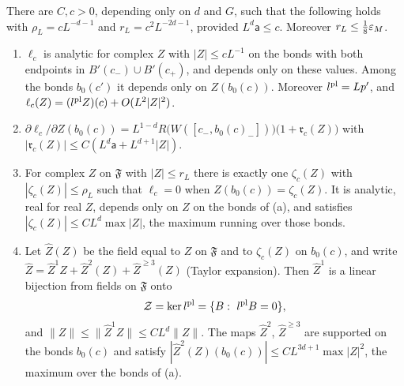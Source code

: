 \begin{lemma}\label{lem:eliminate}
There are $C,c>0$, depending only on $d$ and $G$, such that the following holds with $\rho_L=cL^{-d-1}$ and $r_L=c^2L^{-2d-1}$, provided $L^{d}\mathsf a\le c$. Moreover $r_L\le\frac18\varepsilon_M$.
\begin{enumerate}[label=(\alph*)]
\item $\ell_c$ is analytic for complex $Z$ with $|Z|\le cL^{-1}$ on the bonds with both endpoints in $B'(c_-)\cup B'(c_+)$, and depends only on these values. Among the bonds $b_0(c')$ it depends only on $Z(b_0(c))$. Moreover $l^{\rm pl}=Lp'$, and $\ell_c(Z)=(l^{\rm pl}Z)(c)+O(L^2|Z|^2)$.
\item $\partial\ell_c/\partial Z(b_0(c))=L^{1-d}R\big(W([c_-,b_0(c)_-])\big)\big(1+\mathfrak r_c(Z)\big)$ with $|\mathfrak r_c(Z)|\le C(L^d\mathsf a+L^{d+1}|Z|)$.
\item For complex $Z$ on $\mathfrak F$ with $|Z|\le r_L$ there is exactly one $\zeta_c(Z)$ with $|\zeta_c(Z)|\le\rho_L$ such that $\ell_c=0$ when $Z(b_0(c))=\zeta_c(Z)$. It is analytic, real for real $Z$, depends only on $Z$ on the bonds of (a), and satisfies $|\zeta_c(Z)|\le CL^d\max|Z|$, the maximum running over those bonds.
\item Let $\hat Z(Z)$ be the field equal to $Z$ on $\mathfrak F$ and to $\zeta_c(Z)$ on $b_0(c)$, and write $\hat Z=\hat Z^1Z+\hat Z^2(Z)+\hat Z^{\ge3}(Z)$ (Taylor expansion). Then $\hat Z^1$ is a linear bijection from fields on $\mathfrak F$ onto
\[
\mathcal Z=\ker l^{\rm pl}=\{B:\ l^{\rm pl}B=0\},
\]
and $\|Z\|\le\|\hat Z^1Z\|\le CL^{d}\|Z\|$. The maps $\hat Z^2$, $\hat Z^{\ge3}$ are supported on the bonds $b_0(c)$ and satisfy $|\hat Z^2(Z)(b_0(c))|\le CL^{3d+1}\max|Z|^2$, the maximum over the bonds of (a).
\end{enumerate}
\end{lemma}

